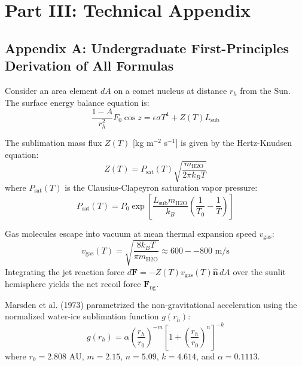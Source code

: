 \documentclass[11pt,a4paper]{article}
\begin{document}
\section*{Part III: Technical Appendix}

\subsection*{Appendix A: Undergraduate First-Principles Derivation of All Formulas}

Consider an area element $dA$ on a comet nucleus at distance $r_h$ from the Sun. The surface energy balance equation is:
\begin{equation}
\frac{1 - A}{r_h^2} F_0 \cos z = \epsilon \sigma T^4 + Z(T) L_{\text{sub}}
\end{equation}

The sublimation mass flux $Z(T)$ [kg m$^{-2}$ s$^{-1}$] is given by the Hertz-Knudsen equation:
\begin{equation}
Z(T) = P_{\text{sat}}(T) \sqrt{\frac{m_{\text{H2O}}}{2 \pi k_B T}}
\end{equation}
where $P_{\text{sat}}(T)$ is the Clausius-Clapeyron saturation vapor pressure:
\begin{equation}
P_{\text{sat}}(T) = P_0 \exp\left[ \frac{L_{\text{sub}} m_{\text{H2O}}}{k_B} \left( \frac{1}{T_0} - \frac{1}{T} \right) \right]
\end{equation}

Gas molecules escape into vacuum at mean thermal expansion speed $v_{\text{gas}}$:
\begin{equation}
v_{\text{gas}}(T) = \sqrt{\frac{8 k_B T}{\pi m_{\text{H2O}}}} \approx 600--800\text{ m/s}
\end{equation}
Integrating the jet reaction force $d\mathbf{F} = -Z(T) v_{\text{gas}}(T) \hat{\mathbf{n}} \, dA$ over the sunlit hemisphere yields the net recoil force $\mathbf{F}_{\text{ng}}$.

Marsden et al. (1973) parametrized the non-gravitational acceleration using the normalized water-ice sublimation function $g(r_h)$:
\begin{equation}
g(r_h) = \alpha \left( \frac{r_h}{r_0} \right)^{-m} \left[ 1 + \left( \frac{r_h}{r_0} \right)^n \right]^{-k}
\end{equation}
where $r_0 = 2.808\text{ AU}$, $m = 2.15$, $n = 5.09$, $k = 4.614$, and $\alpha = 0.1113$.
\end{document}
